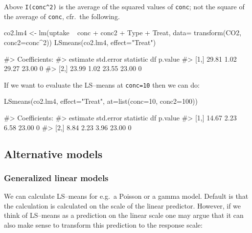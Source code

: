 Above \verb'I(conc^2)' is the average of the squared values of
\texttt{conc}; not the square of the average of \texttt{conc}, cfr.~the
following.

\begin{Schunk}
\begin{Sinput}
co2.lm4 <- lm(uptake ~ conc + conc2 + Type + Treat, data=
              transform(CO2, conc2=conc^2))
LSmeans(co2.lm4, effect="Treat")
\end{Sinput}
\begin{Soutput}
#> Coefficients:
#>      estimate std.error statistic    df p.value
#> [1,]    29.81      1.02     29.27 23.00       0
#> [2,]    23.99      1.02     23.55 23.00       0
\end{Soutput}
\end{Schunk}

If we want to evaluate the LS--means at \texttt{conc=10} then we can do:

\begin{Schunk}
\begin{Sinput}
LSmeans(co2.lm4, effect="Treat", at=list(conc=10, conc2=100))
\end{Sinput}
\begin{Soutput}
#> Coefficients:
#>      estimate std.error statistic    df p.value
#> [1,]    14.67      2.23      6.58 23.00       0
#> [2,]     8.84      2.23      3.96 23.00       0
\end{Soutput}
\end{Schunk}

\hypertarget{alternative-models}{%
\subsection{Alternative models}\label{alternative-models}}

\hypertarget{generalized-linear-models}{%
\subsubsection{Generalized linear
models}\label{generalized-linear-models}}

We can calculate LS--means for e.g.~a Poisson or a gamma model. Default
is that the calculation is calculated on the scale of the linear
predictor. However, if we think of LS--means as a prediction on the
linear scale one may argue that it can also make sense to transform this
prediction to the response scale:

